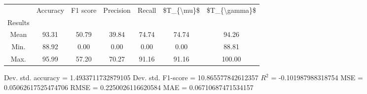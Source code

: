 \begin{tabular}{|c|c|c|c|c|c|c|}
\toprule
{} &  Accuracy &  F1 score &  Precision &  Recall &  \$T\_\{\textbackslash mu\}\$ &  \$T\_\{\textbackslash gamma\}\$ \\
Results &           &           &            &         &            &               \\
\hline
Mean    &     93.31 &     50.79 &      39.84 &   74.74 &      74.74 &         94.26 \\
Min.    &     88.92 &      0.00 &       0.00 &    0.00 &       0.00 &         88.81 \\
Max.    &     95.99 &     57.20 &      70.27 &   91.16 &      91.16 &        100.00 \\
\bottomrule
\end{tabular}

 Dev. std. accuracy = 1.4933711732879105
 Dev. std. F1-score = 10.865577842612357
 $R^2$ = -0.101987988318754
 MSE = 0.05062617525474706
 RMSE = 0.2250026116620584
 MAE = 0.06710687471534157